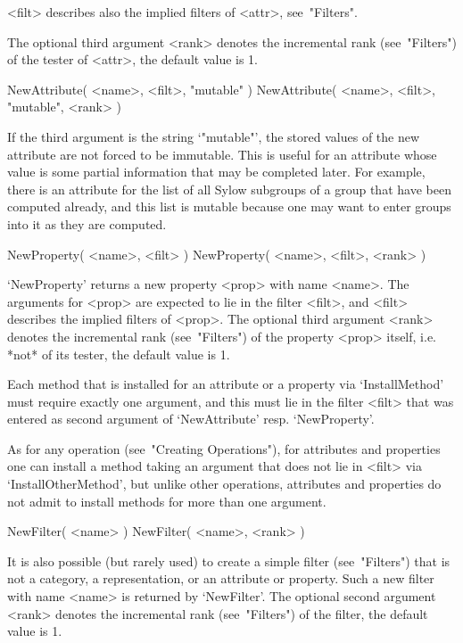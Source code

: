 <filt> describes also the implied filters of <attr>, see~"Filters".

The optional third argument <rank> denotes the incremental rank
(see~"Filters") of the tester of <attr>, the default value is 1.

\>NewAttribute( <name>, <filt>, "mutable" )
\)NewAttribute( <name>, <filt>, "mutable", <rank> )

If the third argument is the string `"mutable"', the stored values of the
new attribute are not forced to be immutable.
This is useful for an attribute whose value is some partial information
that may be completed later.
For example, there is an attribute for the list of all Sylow subgroups
of a group that have been computed already,
and this list is mutable because one may want to enter groups into it
as they are computed.

\>NewProperty( <name>, <filt> )
\)NewProperty( <name>, <filt>, <rank> )

`NewProperty' returns a new property <prop> with name <name>.
The arguments for <prop> are expected to lie in the filter <filt>,
and <filt> describes the implied filters of <prop>.
The optional third argument <rank> denotes the incremental rank
(see~"Filters") of the property <prop> itself, i.e. *not* of its tester,
the default value is 1.

Each method that is installed for an attribute or a property
via `InstallMethod' must require exactly one argument,
and this must lie in the filter <filt> that was entered as second
argument of `NewAttribute' resp. `NewProperty'.

As for any operation (see~"Creating Operations"),
for attributes and properties one can install a method taking an argument
that does not lie in <filt> via `InstallOtherMethod',
but unlike other operations, attributes and properties do not admit
to install methods for more than one argument.



\>NewFilter( <name> )
\)NewFilter( <name>, <rank> )

It is also possible (but rarely used) to create a simple filter
(see~"Filters") that is not a category, a representation,
or an attribute or property.
Such a new filter with name <name> is returned by `NewFilter'.
The optional second argument <rank> denotes the incremental rank
(see~"Filters") of the filter, the default value is 1.

